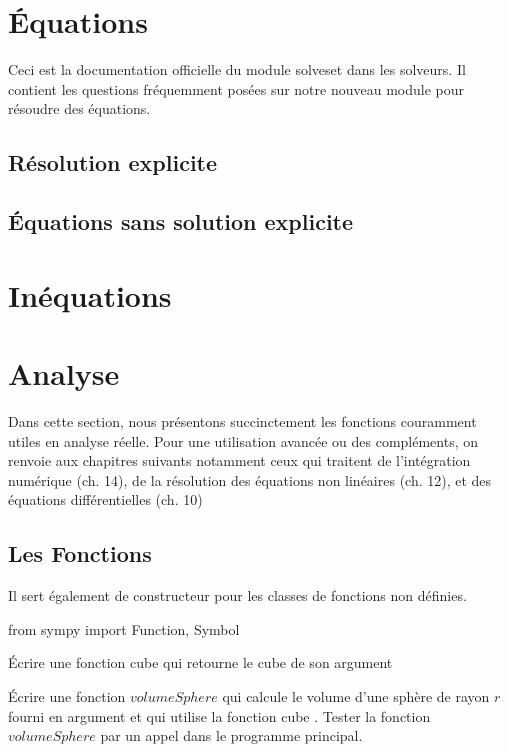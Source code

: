 \section{Équations}
Ceci est la documentation officielle du module solveset dans les solveurs. Il contient les questions fréquemment posées sur notre nouveau module pour résoudre des équations.
 \subsection{Résolution explicite}
 \subsection{Équations sans solution explicite}
\section{In\'equations}
\section{Analyse}
Dans cette section, nous présentons succinctement les fonctions couramment utiles en analyse réelle. Pour une 
utilisation avancée ou des compléments, on renvoie aux chapitres suivants notamment ceux qui traitent de 
l'intégration numérique (ch. 14), de la résolution des équations non linéaires (ch. 12), et des
équations différentielles (ch. 10)
 \subsection{Les Fonctions}
Il sert également de constructeur pour les classes de fonctions non définies.

\begin{python}
from sympy import Function, Symbol
\end{python}

\begin{exercise}
Écrire une fonction cube qui retourne le cube de son argument
\end{exercise}

\begin{exercise}
Écrire une fonction $volumeSphere$ qui calcule le volume d’une sphère de rayon $r$ fourni
en argument et qui utilise la fonction cube .
Tester la fonction $volumeSphere$ par un appel dans le programme principal.
\end{exercise}

